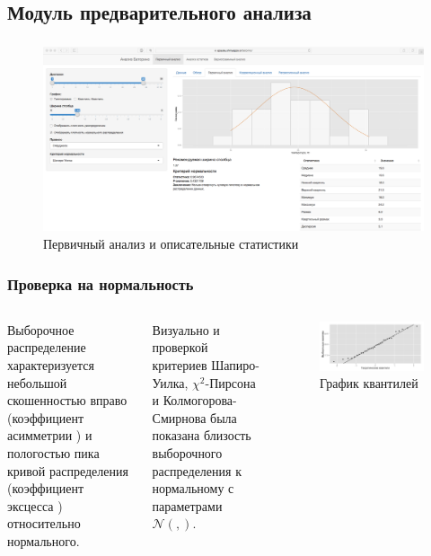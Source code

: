 \documentclass[notheorems]{beamer}
\theoremstyle{definition}
\theoremstyle{example}
\theoremstyle{plain}
\newcommand{\inp}[1]{}
\newcommand{\descriptive}[2]{\inp{#1/descriptive/#2}}
\newcommand{\normaldistr}{$\mathcal{N}(\descriptive{original}{mean}, \descriptive{original}{variance})$}
\begin{document}
\subsection{Модуль предварительного анализа}

\begin{frame}
  \frametitle{\large\secname}
  \framesubtitle{\subsecname}
    \begin{figure}[h]
    \includegraphics[width=1\textwidth]{../../figures/static/1_basis.png}
    \caption{Первичный анализ и описательные статистики}
  \end{figure}
\end{frame}

\begin{frame}
  \frametitle{Проверка на нормальность}
  \begin{columns}[c]
  \column{2in}
  Выборочное распределение характеризуется небольшой скошенностью вправо (коэффициент асимметрии $ \descriptive{original}{skew} $) и пологостью пика кривой распределения (коэффициент эксцесса $ \descriptive{original}{kurtosis} $) относительно нормального.

  \vspace{0.5em}

  Визуально и проверкой критериев Шапиро-Уилка, $\chi^2$-Пирсона и Колмогорова-Смирнова была показана близость выборочного распределения к нормальному с параметрами \normaldistr.
  \column{4in}
  \begin{figure}[h]
    \includegraphics[width=1\linewidth]{../../figures/original/quantile.png}
    \caption{График квантилей}
  \end{figure}
  \end{columns}
\end{frame}
\end{document}
